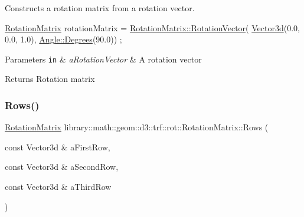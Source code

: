 Constructs a rotation matrix from a rotation vector. 


\begin{DoxyCode}
\hyperlink{classlibrary_1_1math_1_1geom_1_1d3_1_1trf_1_1rot_1_1_rotation_matrix_a7f1184694020cb4f963d58931324ab06}{RotationMatrix} rotationMatrix = \hyperlink{classlibrary_1_1math_1_1geom_1_1d3_1_1trf_1_1rot_1_1_rotation_matrix_a1f7367f6d38b55e05623df62a8ea0be4}{RotationMatrix::RotationVector}(
      \hyperlink{namespacelibrary_1_1math_1_1obj_a977e84e9bf317a4e7dd9d6d671d6da2f}{Vector3d}(0.0, 0.0, 1.0), \hyperlink{classlibrary_1_1math_1_1geom_1_1_angle_a64aa53e8420aeb6f671d86c65c370bc8}{Angle::Degrees}(90.0)) ;
\end{DoxyCode}



\begin{DoxyParams}[1]{Parameters}
\mbox{\tt in}  & {\em a\+Rotation\+Vector} & A rotation vector \\
\hline
\end{DoxyParams}
\begin{DoxyReturn}{Returns}
Rotation matrix 
\end{DoxyReturn}
\mbox{\label{classlibrary_1_1math_1_1geom_1_1d3_1_1trf_1_1rot_1_1_rotation_matrix_aea3e4db9fb93537a0da28e2d50b62a66}} 
\subsubsection{\texorpdfstring{Rows()}{Rows()}}
{\footnotesize\ttfamily \hyperlink{classlibrary_1_1math_1_1geom_1_1d3_1_1trf_1_1rot_1_1_rotation_matrix}{Rotation\+Matrix} library\+::math\+::geom\+::d3\+::trf\+::rot\+::\+Rotation\+Matrix\+::\+Rows (\begin{DoxyParamCaption}\item[{const Vector3d \&}]{a\+First\+Row,  }\item[{const Vector3d \&}]{a\+Second\+Row,  }\item[{const Vector3d \&}]{a\+Third\+Row }\end{DoxyParamCaption})\hspace{0.3cm}{\ttfamily [static]}}



